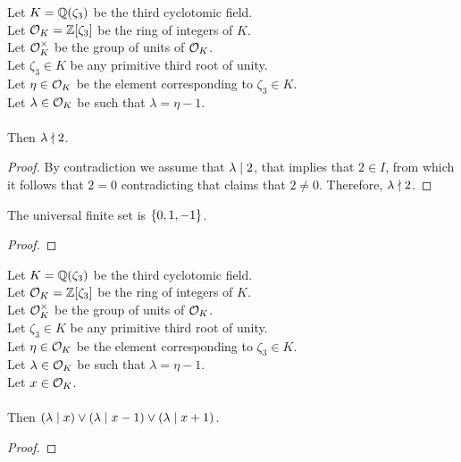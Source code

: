 \begin{lemma}
    \label{lmm:lambda_not_dvd_two}
    \leanok
    Let $K = \mathbb{Q}(\zeta_3)$ be the third cyclotomic field. \\
    Let $\mathcal{O}_K = \mathbb{Z}[\zeta_3]$ be the ring of integers of $K$. \\
    Let $\mathcal{O}^\times_K$ be the group of units of $\mathcal{O}_K$. \\
    Let $\zeta_3 \in K$ be any primitive third root of unity. \\
    Let $\eta \in \mathcal{O}_K$ be the element corresponding to $\zeta_3 \in K$. \\
    Let $\lambda \in \mathcal{O}_K$ be such that $\lambda = \eta -1$. \\\\
    Then $\lambda \nmid 2$.
\end{lemma}
\begin{proof}
    \leanok
    By contradiction we assume that $\lambda \mid 2$, that implies that $2 \in I$,
    from which it follows that $2 = 0$ contradicting 
    that claims that $2 \neq 0$. Therefore, $\lambda \nmid 2$.
\end{proof}

\begin{lemma}
    \label{lmm:univ_quot}
    \leanok
    The universal finite set is $\left\{0, 1, -1\right\}$.
\end{lemma}
\begin{proof}
    \leanok
\end{proof}

\begin{lemma}
    \label{lmm:dvd_or_dvd_sub_one_or_dvd_add_one}
    \leanok
    Let $K = \mathbb{Q}(\zeta_3)$ be the third cyclotomic field. \\
    Let $\mathcal{O}_K = \mathbb{Z}[\zeta_3]$ be the ring of integers of $K$. \\
    Let $\mathcal{O}^\times_K$ be the group of units of $\mathcal{O}_K$. \\
    Let $\zeta_3 \in K$ be any primitive third root of unity. \\
    Let $\eta \in \mathcal{O}_K$ be the element corresponding to $\zeta_3 \in K$. \\
    Let $\lambda \in \mathcal{O}_K$ be such that $\lambda = \eta -1$. \\
    Let $x \in \mathcal{O}_K$. \\\\
    Then $(\lambda \mid x) \lor (\lambda \mid x-1) \lor (\lambda \mid x+1)$.
\end{lemma}
\begin{proof}
    \leanok
\end{proof}

